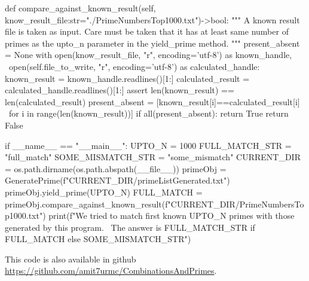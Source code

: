 \documentclass[PermutationsCombinationsWhyWholeNumber.tex]{subfiles}
\begin{document}
\begin{appendices}
\begin{python}
    def compare_against_known_result(self, know_result_file:str="./PrimeNumbersTop1000.txt")->bool:
        """
        A known result file is taken as input. 
        Care must be taken that it has at least same number of primes 
        as the upto_n parameter in the yield_prime method.
        """
        present_absent = None
        with open(know_result_file, "r", encoding='utf-8') as known_handle, \
             open(self.file_to_write, "r", encoding='utf-8') as calculated_handle:
            known_result = known_handle.readlines()[1:]
            calculated_result = calculated_handle.readlines()[1:]
            assert len(known_result) == len(calculated_result)
            present_absent = [known_result[i]==calculated_result[i] \
                              for i in range(len(known_result))]
        if all(present_absent):
            return True
        return False



if __name__ == "__main__":
    UPTO_N = 1000
    FULL_MATCH_STR = "full_match"
    SOME_MISMATCH_STR = "some_mismatch"
    CURRENT_DIR = os.path.dirname(os.path.abspath(__file__))
    primeObj = GeneratePrime(f"{CURRENT_DIR}/primeListGenerated.txt")
    primeObj.yield_prime(UPTO_N)
    FULL_MATCH = primeObj.compare_against_known_result(f"{CURRENT_DIR}/PrimeNumbersTop1000.txt")
    print(f"We tried to match first known {UPTO_N} primes with those generated by this program. \
    The answer is {FULL_MATCH_STR if FULL_MATCH else SOME_MISMATCH_STR}")
	\end{python}	
	This code is also available in github \url{https://github.com/amit7urmc/CombinationsAndPrimes}.

\end{appendices}
\end{document}
